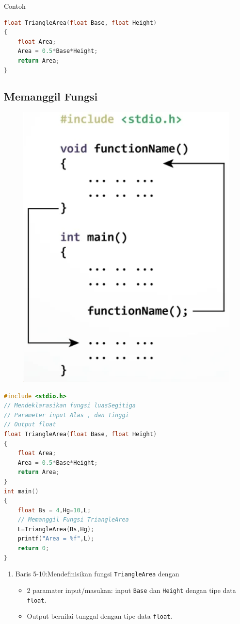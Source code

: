 Contoh

\begin{lstlisting}[language=c]
float TriangleArea(float Base, float Height)
{
	float Area;
	Area = 0.5*Base*Height;
	return Area;
}
\end{lstlisting}


\subsection{Memanggil Fungsi} 

\begin{figure}[H]
	\centering
	\includegraphics[width=0.45\linewidth]{../P3/img/screenshot005.png}
	\caption{}
	\label{fig:memanggilfungsi}
\end{figure}

\begin{lstlisting}[language=c]
	#include <stdio.h>
// Mendeklarasikan fungsi luasSegitiga
// Parameter input Alas , dan Tinggi
// Output float
float TriangleArea(float Base, float Height)
{
	float Area;
	Area = 0.5*Base*Height;
	return Area;
}
int main()
{
	float Bs = 4,Hg=10,L;
    // Memanggil Fungsi TriangleArea
	L=TriangleArea(Bs,Hg);
	printf("Area = %f",L);
	return 0;
}
\end{lstlisting}
\begin{enumerate}
    \item Baris 5-10:Mendefinisikan fungsi \verb*|TriangleArea| dengan 
	\begin{itemize}
        \item 2 paramater input/masukan:
    input \verb*|Base| dan \verb*|Height|  dengan tipe data \verb*|float|.
	    \item Output bernilai tunggal dengan tipe data \verb*|float|.
    \end{itemize}
\end{enumerate}
